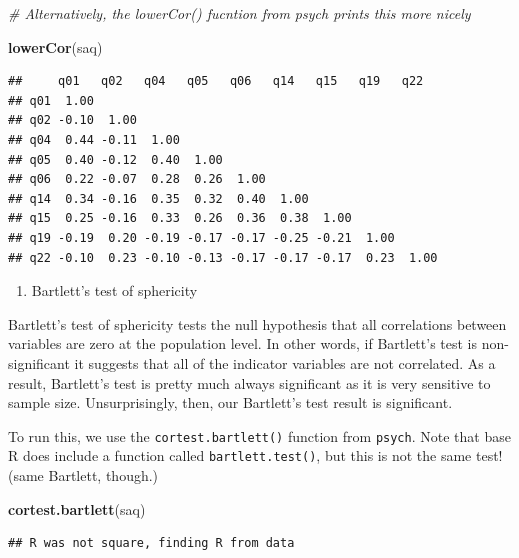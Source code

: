 \documentclass[
]{book}
\newenvironment{Shaded}{\begin{snugshade}}{\end{snugshade}}
\newcommand{\CommentTok}[1]{\textcolor[rgb]{0.56,0.35,0.01}{\textit{#1}}}
\newcommand{\FunctionTok}[1]{\textcolor[rgb]{0.13,0.29,0.53}{\textbf{#1}}}
\newcommand{\NormalTok}[1]{#1}
\providecommand{\tightlist}{%
  \setlength{\itemsep}{0pt}\setlength{\parskip}{0pt}}
\begin{document}
\begin{Shaded}
\begin{Highlighting}[]
\CommentTok{\# Alternatively, the lowerCor() fucntion from psych prints this more nicely}

\FunctionTok{lowerCor}\NormalTok{(saq)}
\end{Highlighting}
\end{Shaded}

\begin{verbatim}
##     q01   q02   q04   q05   q06   q14   q15   q19   q22  
## q01  1.00                                                
## q02 -0.10  1.00                                          
## q04  0.44 -0.11  1.00                                    
## q05  0.40 -0.12  0.40  1.00                              
## q06  0.22 -0.07  0.28  0.26  1.00                        
## q14  0.34 -0.16  0.35  0.32  0.40  1.00                  
## q15  0.25 -0.16  0.33  0.26  0.36  0.38  1.00            
## q19 -0.19  0.20 -0.19 -0.17 -0.17 -0.25 -0.21  1.00      
## q22 -0.10  0.23 -0.10 -0.13 -0.17 -0.17 -0.17  0.23  1.00
\end{verbatim}

\begin{enumerate}
\def\labelenumi{\arabic{enumi}.}
\setcounter{enumi}{1}
\tightlist
\item
  Bartlett's test of sphericity
\end{enumerate}

Bartlett's test of sphericity tests the null hypothesis that all correlations between variables are zero at the population level. In other words, if Bartlett's test is non-significant it suggests that all of the indicator variables are not correlated. As a result, Bartlett's test is pretty much always significant as it is very sensitive to sample size. Unsurprisingly, then, our Bartlett's test result is significant.

To run this, we use the \texttt{cortest.bartlett()} function from \texttt{psych}. Note that base R does include a function called \texttt{bartlett.test()}, but this is not the same test! (same Bartlett, though.)

\begin{Shaded}
\begin{Highlighting}[]
\FunctionTok{cortest.bartlett}\NormalTok{(saq)}
\end{Highlighting}
\end{Shaded}

\begin{verbatim}
## R was not square, finding R from data
\end{verbatim}
\end{document}
